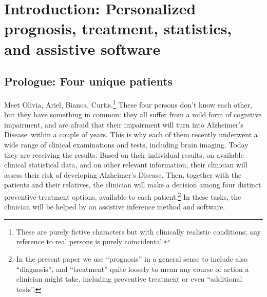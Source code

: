 \documentclass[a4paper,12pt,%
onecolumn,oneside,article,%
british%
]{memoir}
\theoremstyle{remark}
\theoremstyle{innote}
\renewcommand*{\|}[1][]{\nonscript\:#1\vert\nonscript\:\mathopen{}}
\newcommand*{\ad}{Alzheimer's Disease}
\begin{document}

\section{Introduction: Personalized prognosis, treatment, statistics, and assistive software}
\label{sec:intro}

\setcounter{subsection}{-1}
\subsection{Prologue: Four unique patients}
\label{sec:four_patients}

Meet Olivia, Ariel, Bianca, Curtis.\footnote{These are purely fictive characters but with clinically realistic conditions; any reference to real persons is purely coincidental.}
These four persons don't know each other, but they have something in common: they all suffer from a mild form of cognitive impairment, and are afraid that their impairment will turn into \ad\ within a couple of years. This is why each of them recently underwent a wide range of clinical examinations and tests, including brain imaging. %
Today they are receiving the results. Based on their individual results, on available clinical statistical data, and on other relevant information, their clinician will 
assess their risk of developing \ad. Then, together with the patients and their relatives, the clinician will make a decision among four distinct preventive-treatment options, available to each patient.\footnote{\label{fn:treatment}In the present paper we use \enquote{prognosis} in a general sense to include also \enquote{diagnosis}, and \enquote{treatment} quite loosely to mean any course of action a clinician might take, including preventive treatment or even \enquote{additional tests}.} In these tasks, the clinician will be helped by an assistive inference method and software.
\end{document}
